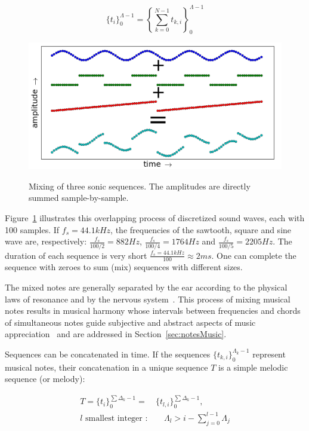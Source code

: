 \begin{equation}\label{eq:mixagem}
\{t_i\}_0^{\Lambda-1}=\left \{ \sum_{k=0}^{N-1}t_{k,i} \right \}_0^{\Lambda-1}
\end{equation}

\begin{figure}[h!]
    {\centering
        \includegraphics[width=.5\columnwidth]{figures/mixagem__}}
    \caption{Mixing of three sonic sequences. The amplitudes are directly summed sample-by-sample.}
        \label{fig:mixagem}
\end{figure}

Figure~\ref{fig:mixagem} illustrates this overlapping process of discretized sound waves, each with 100 samples. If $f_s=44.1kHz$, the frequencies of the sawtooth, square and sine wave are, respectively: $\frac{f_s}{100/2}=882Hz$, $\frac{f_s}{100/4}=1764Hz$ and $\frac{f_s}{100/5}=2205Hz$. The duration of each sequence is very short $\frac{f_s=44.1kHz}{100} \approx 2ms$. One can complete the sequence with zeroes to sum (mix) sequences with different sizes.

The mixed notes are generally separated by the ear according to the physical laws of resonance and by the nervous system~\cite{Roederer}.
This process of mixing musical notes results in musical harmony whose intervals between frequencies and chords of simultaneous notes guide subjective and abstract aspects of music appreciation~\cite{Harmonia} and are addressed in Section~\ref{sec:notesMusic}. 

Sequences can be concatenated in time. If the sequences $\{t_{k,i}\}_0^{\Lambda_k-1}$ represent musical notes,
their concatenation in a unique sequence $T$ is a simple melodic sequence (or melody):

\begin{equation}\label{eq:concatenacao}
\begin{split}
T = \{t_i\}_0^{\sum\Delta_k-1}= & \{t_{l,i}\}_0^{\sum\Delta_k-1}, \;\; \\ l\text{ smallest integer } : & \quad \Lambda_l > i -\sum_{j=0}^{l-1}\Lambda_j
\end{split}
\end{equation}

